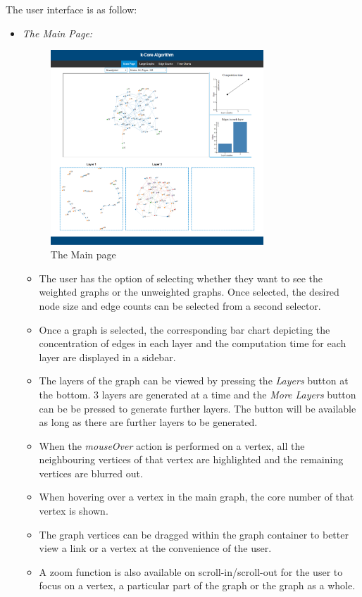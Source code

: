The user interface is as follow:
\begin{itemize}
    \item{\textit{The Main Page:}} 
    \begin{figure}[!htbp]
    \begin{center}
    \includegraphics[width=8cm]{Final_Interface.png}
    \end{center}
    \caption{ The Main page }
    \end{figure}
    \begin{itemize}
        \item The user has the option of selecting whether they want to see the weighted graphs or the unweighted graphs. Once selected, the desired node size and edge counts can be selected from a second selector.
        \item Once a graph is selected, the corresponding bar chart depicting the concentration of edges in each layer and the computation time for each layer are displayed in a sidebar.
        \item The layers of the graph can be viewed by pressing the \textit{Layers} button at the bottom. 3 layers are generated at a time and the \textit{More Layers} button can be be pressed to generate further layers. The button will be available as long as there are further layers to be generated.
        \item When the \textit{mouseOver} action is performed on a vertex, all the neighbouring vertices of that vertex are highlighted and the remaining vertices are blurred out.
        \item When hovering over a vertex in the main graph, the core number of that vertex is shown.
        \item The graph vertices can be dragged within the graph container to better view a link or a vertex at the convenience of the user.
        \item A zoom function is also available on scroll-in/scroll-out for the user to focus on a vertex, a particular part of the graph or the graph as a whole.
    \end{itemize}
    

\end{itemize}
